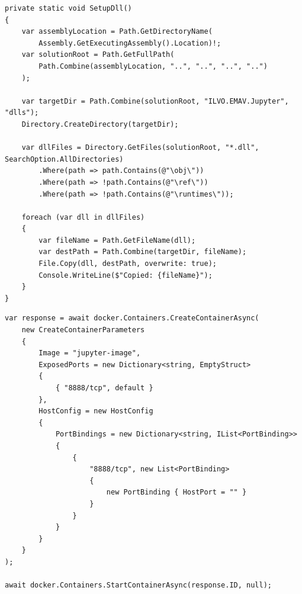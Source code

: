 \begin{listing}[ht]
\begin{verbatim}
private static void SetupDll()
{
    var assemblyLocation = Path.GetDirectoryName(
        Assembly.GetExecutingAssembly().Location)!;
    var solutionRoot = Path.GetFullPath(
        Path.Combine(assemblyLocation, "..", "..", "..", "..")
    );

    var targetDir = Path.Combine(solutionRoot, "ILVO.EMAV.Jupyter", "dlls");
    Directory.CreateDirectory(targetDir);

    var dllFiles = Directory.GetFiles(solutionRoot, "*.dll", SearchOption.AllDirectories)
        .Where(path => path.Contains(@"\obj\"))
        .Where(path => !path.Contains(@"\ref\"))
        .Where(path => !path.Contains(@"\runtimes\"));

    foreach (var dll in dllFiles)
    {
        var fileName = Path.GetFileName(dll);
        var destPath = Path.Combine(targetDir, fileName);
        File.Copy(dll, destPath, overwrite: true);
        Console.WriteLine($"Copied: {fileName}");
    }
}
\end{verbatim}
\caption[Implementatie van de \texttt{SetupDll}-methode.]{Implementatie van de \texttt{SetupDll}-methode voor het verzamelen van DLL-bestanden.}
\label{lst:setupdll}
\end{listing}

\begin{listing}[ht]
\begin{verbatim}
var response = await docker.Containers.CreateContainerAsync(
    new CreateContainerParameters
    {
        Image = "jupyter-image",
        ExposedPorts = new Dictionary<string, EmptyStruct> 
        { 
            { "8888/tcp", default } 
        },
        HostConfig = new HostConfig
        {
            PortBindings = new Dictionary<string, IList<PortBinding>>
            {
                {
                    "8888/tcp", new List<PortBinding>
                    {
                        new PortBinding { HostPort = "" }
                    }
                }
            }
        }
    }
);

await docker.Containers.StartContainerAsync(response.ID, null);
\end{verbatim}
\caption[Aanmaken en opstarten van de Jupyter Docker-container.]{Aanmaken en opstarten van de Jupyter Docker-container via Docker.DotNet.}
\label{lst:docker_create}
\end{listing}

